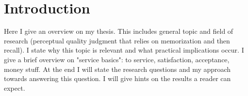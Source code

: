 \chapter{Introduction}\label{chap:01}
\begin{chapter-abstract}
Here I give an overview on my thesis.
This includes general topic and field of research (perceptual quality judgment that relies on memorization and then recall).
I state why this topic is relevant and what practical implications occur.
I give a brief overview on "service basics": to service, satisfaction, acceptance, money stuff.
At the end I will state the research questions and my approach towards answering this question.
I will give hints on the results a reader can expect.
\end{chapter-abstract}


